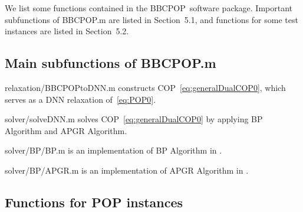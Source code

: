 \documentclass[12pt]{article}
\def\matBP{BBCPOP}
\begin{document}
\label{mainFunctions}

We list some functions contained in the \matBP\ software package. Important subfunctions 
of \matBP.m are listed in 
Section~5.1, and functions for some test instances are listed in Section~5.2. 

\subsection{Main subfunctions of \matBP.m}



\begin{description}
\item{relaxation/BBCPOPtoDNN.m} constructs COP~\eqref{eq:generalDualCOP0}, 
which serves as a DNN relaxation of~\eqref{eq:POP0}. 
\item{solver/solveDNN.m } solves COP~\eqref{eq:generalDualCOP0} by applying BP Algorithm and APGR Algorithm.
\item{solver/BP/BP.m } is an implementation of BP Algorithm in \cite{ITO2018}.
\item{solver/BP/APGR.m} is an implementation of APGR Algorithm in \cite{ITO2018}.
\end{description}

\subsection{Functions for POP instances}
\end{document}
